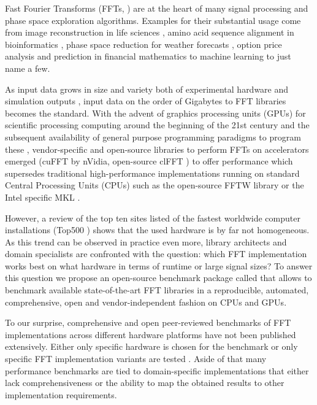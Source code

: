 Fast Fourier Transforms (FFTs, \citep{van1992computational}) are at the heart of many signal processing and phase space exploration algorithms. Examples for their substantial usage come from image reconstruction in life sciences \citep{preibisch2014efficient,schmid2015real}, amino acid sequence alignment in bioinformatics \citep{katoh2002mafft}, phase space reduction for weather forecasts \citep{maronga2015parallelized}, option price analysis and prediction in financial mathematics \citep{dempster2002spread,hurd2010fourier} to machine learning \citep{collobert2011torch7,jia2014caffe,abadi2016tensorflow} to just name a few.

As input data grows in size and variety both of experimental hardware \citep{huisken2004optical} and simulation outputs \citep{maronga2015parallelized}, input data on the order of Gigabytes to FFT libraries becomes the standard. With the advent of graphics processing units (GPUs) for scientific processing computing around the beginning of the 21st century and the subsequent availability of general purpose programming paradigms to program these \citep{du2012cuda}, vendor-specific and open-source libraries to perform FFTs on accelerators emerged (cuFFT \citep{nvidia2010cufft} by nVidia, open-source clFFT \citep{clfft}) to offer performance which supersedes traditional high-performance implementations running on standard Central Processing Units (CPUs) such as the open-source FFTW library \citep{FFTW97,FFTW05} or the Intel specific MKL \citep{intel2007intel}.

However, a review of the top ten sites listed of the fastest worldwide computer installations (Top500 \citep{meuer2011top500}) shows that the used hardware is by far not homogeneous. As this trend can be observed in practice even more, library architects and domain specialists are confronted with the question: which FFT implementation works best on what hardware in terms of runtime or large signal sizes?  
To answer this question we propose an open-source benchmark package called \gearshifft{} \citep{gearshifft_github} that allows to benchmark available state-of-the-art FFT libraries in a reproducible, automated, comprehensive, open and vendor-independent fashion on CPUs and GPUs.

To our surprise, comprehensive and open peer-reviewed benchmarks of FFT implementations across different hardware platforms have not been published extensively. Either only specific hardware is chosen for the benchmark \citep{park2015fast,eleftheriou2005performance} or only specific FFT implementation variants are tested \citep{shoc2010,dongarra2013hpc}. Aside of that many performance benchmarks are tied to domain-specific implementations \citep{fialka2006fft} that either lack comprehensiveness or the ability to map the obtained results to other implementation requirements.

